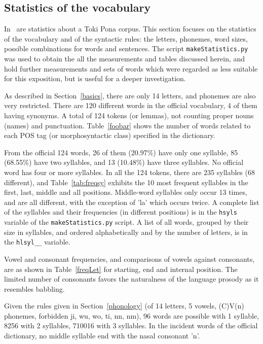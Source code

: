 \documentclass{article}
\newcommand{\tttt}[1]{\texttt{#1}}
\begin{document}
\subsection{Statistics of the vocabulary}\label{sec:stat}
In~\cite{corpus} are statistics about a Toki Pona corpus.
This section focuses on the statistics of the vocabulary
and of the syntactic rules:
the letters, phonemes, word sizes,
possible combinations for words and sentences.
The script \tttt{makeStatistics.py}
was used to obtain the all the measurements and tables
discussed herein,
and hold further measurements and sets of words
which were regarded as less suitable for this exposition,
but is useful for a deeper investigation.

As described in Section~\ref{basics},
there are only 14 letters,
and phonemes are also very restricted.
There are 120 different words in the official vocabulary,
4 of them having synonyms.
A total of 124 tokens (or lemmas),
not counting proper nouns (names)
and punctuation.
Table~\ref{foobar} shows the number of words
related to each POS tag (or morphosyntactic class)
specified in the dictionary.



From the official 124 words, 
26 of them (20.97\%)
have only one syllable,
85 (68.55\%) have two syllables,
and 13 (10.48\%) have three syllables.
No official word has four or more syllables.
In all the 124 tokens, there are 235 syllables (68 different),
and Table~\ref{tab:freqsy} exhibits the 10 most frequent
syllables in the first, last, middle and all positions.
Middle-word syllables only occur 13 times,
and are all different, with the exception of 'la'
which occurs twice.
A complete list of the syllables and their frequencies (in different
positions) is in the \tttt{hsyls} variable of the \tttt{makeStatistics.py}
script.
A list of all words, grouped by their size in syllables,
and ordered alphabetically and by the number of letters,
is in the \tttt{hlsyl\_\_} variable.



Vowel and consonant frequencies,
and comparisons of vowels against consonants,
are as shown in Table~\ref{freqLet}
for starting, end and internal position.
The limited number of consonants favors
the naturalness of the language prosody
as it resembles babbling.



Given the rules given in Section~\ref{phonology}
(of 14 letters, 5 vowels, (C)V(n) phonemes,
forbidden ji, wu, wo, ti, nn, nm),
96 words are possible with 1 syllable,
8256 with 2 syllables, 710016 with 3 syllables.
In the incident words of the official dictionary,
no middle syllable end with the nasal consonant 'n'.
\end{document}
